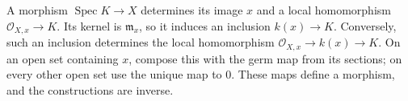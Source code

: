 A morphism $\operatorname{Spec}K\to X$ determines its image $x$ and a local homomorphism $\mathcal O_{X,x}\to K$. Its kernel is $\mathfrak m_x$, so it induces an inclusion $k(x)\to K$. Conversely, such an inclusion determines the local homomorphism $\mathcal O_{X,x}\to k(x)\to K$. On an open set containing $x$, compose this with the germ map from its sections; on every other open set use the unique map to $0$. These maps define a morphism, and the constructions are inverse.
